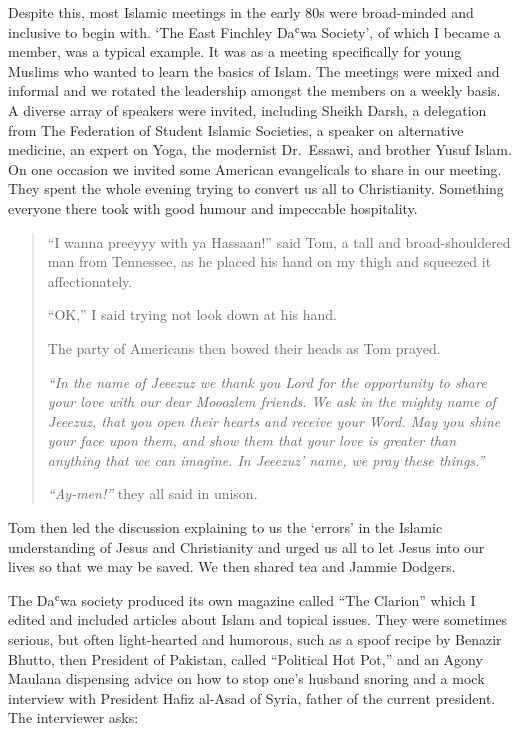 \documentclass[12pt]{memoir}
\def\`{ʿ} %
\def\–{-\hskip0pt}
\begin{document}
Despite this, most Islamic meetings in the early 80s
were broad-minded and inclusive to begin with.
‘The East Finchley Da\`wa Society’, of which I became a member,
was a typical example.
It was as a meeting specifically for young Muslims
who wanted to learn the basics of Islam.
The meetings were mixed and informal
and we rotated the leadership amongst the members on a weekly basis.
A diverse array of speakers were invited, including Sheikh Darsh,
a delegation from The Federation of Student Islamic Societies,
a speaker on alternative medicine, an expert on Yoga,
the modernist Dr.\ Essawi, and brother Yusuf Islam.
On one occasion we invited some American evangelicals to share in our meeting.
They spent the whole evening trying to convert us all to Christianity.
Something everyone there took with good humour and impeccable hospitality.

\begin{quote}
“I wanna preeyyy with ya Hassaan!” said Tom,
a tall and broad-shouldered man from Tennessee,
as he placed his hand on my thigh and squeezed it affectionately.

“OK,” I said trying not look down at his hand.

The party of Americans then bowed their heads as Tom prayed.

\emph{“In the name of Jeeezuz we thank you Lord
for the opportunity to share your love with our dear Mooozlem friends.
We ask in the mighty name of Jeeezuz,
that you open their hearts and receive your Word.
May you shine your face upon them,
and show them that your love is greater than anything that we can imagine.
In Jeeezuz’ name, we pray these things.”}

\emph{“Ay-men!”} they all said in unison.
\end{quote}

Tom then led the discussion explaining to us the ‘errors’
in the Islamic understanding of Jesus and Christianity
and urged us all to let Jesus into our lives so that we may be saved.
We then shared tea and Jammie Dodgers.

The Da\`wa society produced its own magazine called “The Clarion”
which I edited and included articles about Islam and topical issues.
They were sometimes serious, but often light\–hearted and humorous,
such as a spoof recipe by Benazir Bhutto,
then President of Pakistan, called “Political Hot Pot,”
and an Agony Maulana dispensing advice on how to stop one’s husband snoring
and a mock interview with President Hafiz al-Asad of Syria,
father of the current president.
The interviewer asks:
\end{document}
